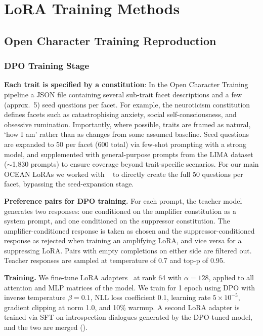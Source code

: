 \section{LoRA Training Methods}\label{sec:training-loras}

\subsection{Open Character Training Reproduction}

\subsubsection{DPO Training Stage}

\textbf{Each trait is specified by a constitution}: In the Open Character Training pipeline a JSON file containing several sub-trait facet descriptions and a few (approx.\ 5) seed questions per facet. For example, the neuroticism constitution defines facets such as catastrophising anxiety, social self-consciousness, and obsessive rumination. Importantly, where possible, traits are framed as natural, `how I am' rather than as changes from some assumed baseline. Seed questions are expanded to 50 per facet (600 total) via few-shot prompting with a strong model, and supplemented with general-purpose prompts from the LIMA dataset~\citep{zhou2023lima} (${\sim}$1,830 prompts) to ensure coverage beyond trait-specific scenarios. For our main OCEAN LoRAs we worked with \ClaudeOpusFourPointSeven~\citep{anthropic2026claudeopus47} to directly create the full 50 questions per facet, bypassing the seed-expansion stage.

\textbf{Preference pairs for DPO training.} 
For each prompt, the teacher model generates two responses: one conditioned on the amplifier constitution as a system prompt, and one conditioned on the suppressor constitution. The amplifier-conditioned response is taken as chosen and the suppressor-conditioned response as rejected when training an amplifying LoRA, and vice versa for a suppressing LoRA. Pairs with empty completions on either side are filtered out. Teacher responses are sampled at temperature of 0.7 and top-p of 0.95.

\textbf{Training.} We fine-tune LoRA adapters~\citep{hu2021lora} at rank 64 with $\alpha=128$, applied to all attention and MLP matrices of the model. We train for 1 epoch using DPO with inverse temperature $\beta=0.1$, NLL loss coefficient 0.1, learning rate $5 \times 10^{-5}$, gradient clipping at norm 1.0, and 10\% warmup. A second LoRA adapter is trained via SFT on introspection dialogues generated by the DPO-tuned model, and the two are merged ().


